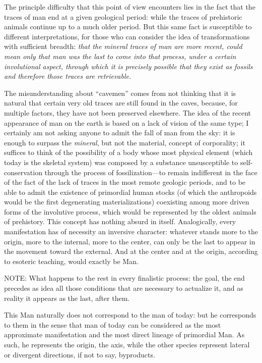 The principle difficulty that this point of view encounters lies in the fact that the traces of man end at a given geological period: while the traces of prehistoric animals continue up to a much older period. But this same fact is susceptible to different interpretations, for those who can consider the idea of transformations with sufficient breadth: \emph{that the mineral traces of man are more recent, could mean only that man was the last to come into that process, under a certain involutional aspect, through which it is precisely possible that they exist as fossils and therefore those traces are retrievable.}

The misunderstanding about ``cavemen'' comes from not thinking that it is natural that certain very old traces are still found in the caves, because, for multiple factors, they have not been preserved elsewhere. The idea of the recent appearance of man on the earth is based on a lack of vision of the same type; I certainly am not asking anyone to admit the fall of man from the sky: it is enough to surpass the \emph{mineral}, but not the material, concept of corporality; it suffices to think of the possibility of a body whose most physical element (which today is the skeletal system) was composed by a substance unsusceptible to self-conservation through the process of fossilization---to remain indifferent in the face of the fact of the lack of traces in the most remote geologic periods, and to be able to admit the existence of primordial human stocks (of which the anthropoids would be the first degenerating materializations) coexisting among more driven forms of the involutive process, which would be represented by the oldest animals of prehistory. This concept has nothing absurd in itself. Analogically, every manifestation has of necessity an inversive character: whatever stands more to the origin, more to the internal, more to the center, can only be the last to appear in the movement toward the external. And at the center and at the origin, according to esoteric teaching, would exactly be Man.

NOTE: What happens to the rest in every finalistic process: the goal, the end precedes as idea all those conditions that are necessary to actualize it, and as reality it appears as the last, after them.

This Man naturally does not correspond to the man of today: but he corresponds to them in the sense that man of today can be considered as the most approximate manifestation and the most direct lineage of primordial Man. As such, he represents the origin, the axis, while the other species represent lateral or divergent directions, if not to say, byproducts.


